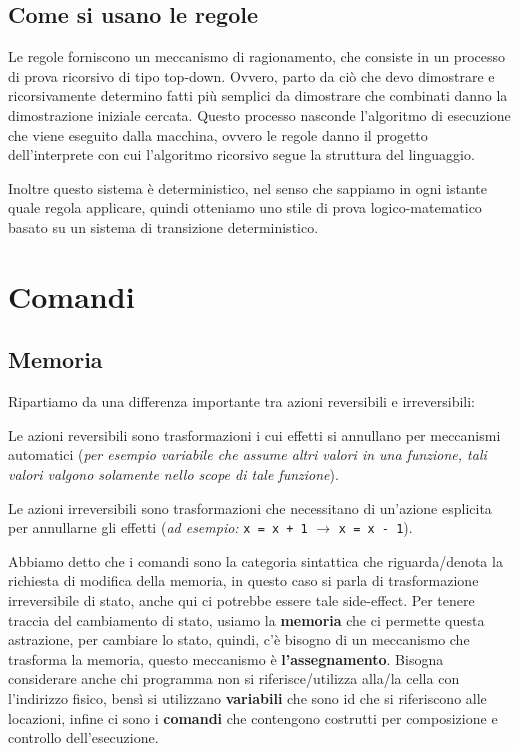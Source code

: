 \documentclass[oneside,a4paper,11pt]{book}
\theoremstyle{italicstyle}
\theoremstyle{normStyle}
\begin{document}
\section{Come si usano le regole}
Le regole forniscono un meccanismo di ragionamento, che consiste in un processo di
prova ricorsivo di tipo top-down. Ovvero, parto da ciò che devo
dimostrare e ricorsivamente determino fatti più
semplici da dimostrare che combinati danno la dimostrazione iniziale
cercata.
Questo processo nasconde l’algoritmo di esecuzione che viene eseguito
dalla macchina, ovvero le regole danno il progetto dell’interprete
con cui l’algoritmo ricorsivo segue la struttura del linguaggio.

Inoltre questo sistema è deterministico, nel senso che sappiamo in ogni istante quale
regola applicare, quindi otteniamo uno stile di prova logico-matematico basato 
su un sistema di transizione deterministico.
\chapter{Comandi}
\section{Memoria}
Ripartiamo da una differenza importante tra azioni reversibili e irreversibili:
\begin{tcolorbox}[title = {Azioni reversibili}]
    Le azioni reversibili sono trasformazioni i cui effetti si annullano per meccanismi 
    automatici (\textit{per esempio variabile che assume altri valori in una funzione, tali valori 
    valgono solamente nello scope di tale funzione}).
\end{tcolorbox}
\begin{tcolorbox}[title = {Azioni irreversibili}]
  Le azioni irreversibili sono trasformazioni che necessitano di un'azione esplicita 
  per annullarne gli effetti (\textit{ad esempio:} \verb|x = x + 1| $\rightarrow$ \verb|x = x - 1|).
\end{tcolorbox}
Abbiamo detto che i comandi sono la categoria sintattica che riguarda/denota la 
richiesta di modifica della memoria, in questo caso si parla di trasformazione irreversibile di 
stato, anche qui ci potrebbe essere tale side-effect.
Per tenere traccia del cambiamento di stato, usiamo la \textbf{memoria} che ci permette questa astrazione,
per cambiare lo stato, quindi, c'è bisogno di un meccanismo che trasforma la memoria, questo 
meccanismo è \textbf{l'assegnamento}. Bisogna considerare anche chi programma non si riferisce/utilizza alla/la cella
con l'indirizzo fisico, bensì si utilizzano \textbf{variabili} che sono id che si riferiscono alle
locazioni, infine ci sono i \textbf{comandi} che contengono costrutti per composizione e controllo dell'esecuzione.
\end{document}
